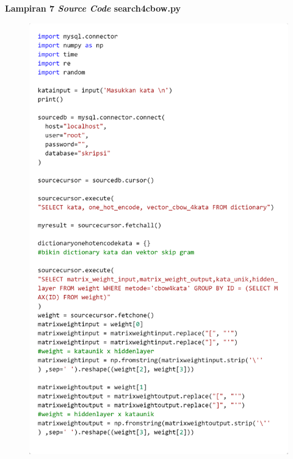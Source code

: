 \documentclass[12pt]{report}
\begin{document}
\newpage
{\parindent0pt \textbf{Lampiran 7 \textit{Source Code} search4cbow.py}}
\begin{figure}[H]
\centering
\includegraphics[scale=0.3]{search4cbow1}
\end{figure}
\end{document}
